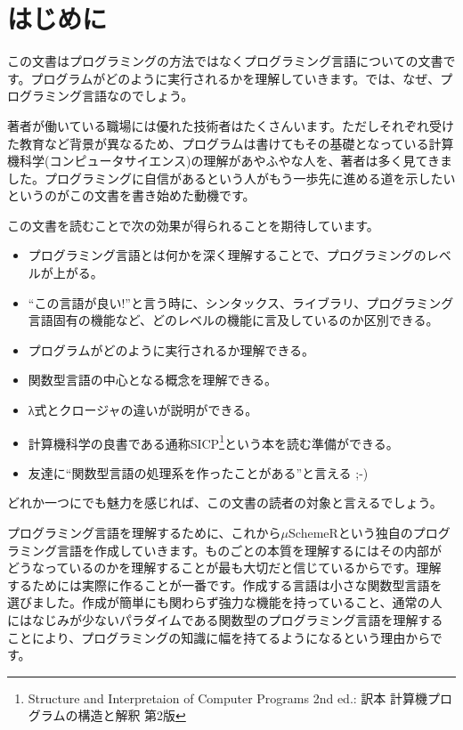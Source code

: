 

\chapter*{はじめに\hspace{-3mm}}

この文書はプログラミングの方法ではなくプログラミング言語についての文書です。プログラムがどのように実行されるかを理解していきます。では、なぜ、プログラミング言語なのでしょう。

著者が働いている職場には優れた技術者はたくさんいます。ただしそれぞれ受けた教育など背景が異なるため、プログラムは書けてもその基礎となっている計算機科学(コンピュータサイエンス)の理解があやふやな人を、著者は多く見てきました。プログラミングに自信があるという人がもう一歩先に進める道を示したいというのがこの文書を書き始めた動機です。

この文書を読むことで次の効果が得られることを期待しています。
\begin{itemize}
\item プログラミング言語とは何かを深く理解することで、プログラミングのレベルが上がる。
\item “この言語が良い!”と言う時に、シンタックス、ライブラリ、プログラミング言語固有の機能など、どのレベルの機能に言及しているのか区別できる。
\item プログラムがどのように実行されるか理解できる。
\item 関数型言語の中心となる概念を理解できる。
\item λ式とクロージャの違いが説明ができる。
\item 計算機科学の良書である通称SICP\footnote{Structure and Interpretaion of Computer Programs 2nd ed.: 訳本 計算機プログラムの構造と解釈 第2版}という本を読む準備ができる。
\item 友達に“関数型言語の処理系を作ったことがある”と言える ;-)
\end{itemize}
どれか一つにでも魅力を感じれば、この文書の読者の対象と言えるでしょう。

プログラミング言語を理解するために、これから$\mu$SchemeRという独自のプログ
ラミング言語を作成していきます。ものごとの本質を理解するにはその内部が
どうなっているのかを理解することが最も大切だと信じているからです。理解
するためには実際に作ることが一番です。作成する言語は小さな関数型言語を
選びました。作成が簡単にも関わらず強力な機能を持っていること、通常の人
にはなじみが少ないパラダイムである関数型のプログラミング言語を理解する
ことにより、プログラミングの知識に幅を持てるようになるという理由からで
す。

